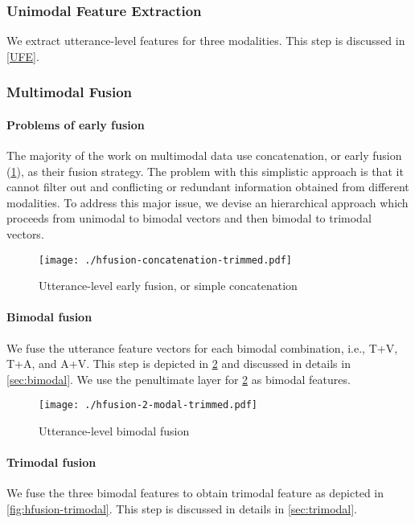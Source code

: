 \documentclass[review]{elsarticle}
\newcommand\?[1]{\hl{#1}}
\begin{document}
\subsubsection{Unimodal Feature Extraction}
We extract utterance-level features for three modalities. This step is discussed
in \cref{UFE}.

\subsubsection{Multimodal Fusion}

\paragraph{Problems of early fusion}
The majority of the work on multimodal data use concatenation, or early fusion
(\cref{fig:early_fusion}), as their fusion strategy. The problem with this
simplistic approach is that it cannot filter out and conflicting or redundant
information obtained from different modalities. To address this major issue, we
devise an hierarchical approach which proceeds from unimodal to bimodal vectors
and then bimodal to trimodal vectors.

\begin{figure}[ht]
    \centering
    \texttt{[image: ./hfusion-concatenation-trimmed.pdf]}
    \caption{Utterance-level early fusion, or simple concatenation}
    \label{fig:early_fusion}
\end{figure}

\paragraph{Bimodal fusion}
We fuse the utterance feature vectors for each bimodal combination, i.e., T+V,
T+A, and A+V. This step is depicted in \cref{fig:hfusion-bimodal} and discussed
in details in \cref{sec:bimodal}.
We use the penultimate layer for \cref{fig:hfusion-bimodal} as bimodal features.

\begin{figure}[ht]
    \centering
    \texttt{[image: ./hfusion-2-modal-trimmed.pdf]}
    \caption{Utterance-level bimodal fusion}
    \label{fig:hfusion-bimodal}
\end{figure}

\paragraph{Trimodal fusion}
We fuse the three bimodal features to obtain trimodal feature as depicted in
\cref{fig:hfusion-trimodal}. This step is discussed in details in \cref{sec:trimodal}.
\end{document}
